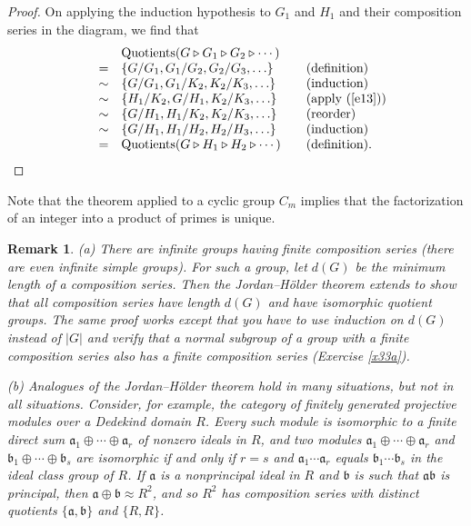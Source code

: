 \documentclass[a4paper,11pt,final,openany]{memoir}%
\newtheorem{remark}[X]{Remark}
\theoremstyle{nonumberplain}
\newtheorem{proof}{Proof.}
\begin{document}
\begin{proof}
On applying the induction hypothesis to $G_{1}$ and $H_{1}$ and their
composition series in the diagram, we find that
\[%
\begin{array}
[c]{rclll}%
&&\text{Quotients}(G\triangleright G_{1}\triangleright G_{2}\triangleright
\cdots) \\
& = & \{G/G_{1},G_{1}/G_{2},G_{2}/G_{3},\ldots\} &  &
\text{(definition)}\\
& \sim & \{G/G_{1},G_{1}/K_{2},K_{2}/K_{3},\ldots\} &  & \text{(induction)}\\
& \sim & \{H_{1}/K_{2},G/H_{1},K_{2}/K_{3},\ldots\} &  & \text{(apply
(\ref{e13}))}\\
& \sim & \{G/H_{1},H_{1}/K_{2},K_{2}/K_{3},\ldots\} &  & \text{(reorder)}\\
& \sim & \{G/H_{1},H_{1}/H_{2},H_{2}/H_{3},\ldots\} &  & \text{(induction)}\\
& = & \text{Quotients}(G\triangleright H_{1}\triangleright H_{2}%
\triangleright\cdots) &  & \text{(definition).}%
\end{array}
\]

\end{proof}

Note that the theorem applied to a cyclic group $C_{m}$ implies that the
factorization of an integer into a product of primes is unique.

\begin{remark}
\label{ns03}(a) There are infinite groups having finite composition series
(there are even infinite simple groups). For such a group, let $d(G)$ be the
minimum length of a composition series. Then the Jordan--H\"{o}lder theorem
extends to show that all composition series have length $d(G)$ and have
isomorphic quotient groups. The same proof works except that you have to use
induction on $d(G)$ instead of $|G|$ and verify that a normal subgroup of a
group with a finite composition series also has a finite composition series
(Exercise \ref{x33a}).

(b) Analogues of the Jordan--H\"{o}lder theorem hold in many situations, but
not in all situations. Consider, for example, the category of finitely
generated projective modules over a Dedekind domain $R$. Every such module is
isomorphic to a finite direct sum $\mathfrak{a}_{1}\oplus\cdots\oplus
\mathfrak{a}_{r}$ of nonzero ideals in $R$, and two modules $\mathfrak{a}%
_{1}\oplus\cdots\oplus\mathfrak{a}_{r}$ and $\mathfrak{b}_{1}\oplus
\cdots\oplus\mathfrak{b}_{s}$ are isomorphic if and only if $r=s$ and
$\mathfrak{a}_{1}\cdots\mathfrak{a}_{r}$ equals $\mathfrak{b}_{1}%
\cdots\mathfrak{b}_{s}$ in the ideal class group of $R$. If $\mathfrak{a}$ is
a nonprincipal ideal in $R$ and $\mathfrak{b}$ is such that $\mathfrak{a}%
\mathfrak{b}$ is principal, then $\mathfrak{a}\oplus\mathfrak{b}\approx R^{2}%
$, and so $R^{2}$ has composition series with distinct quotients
$\{\mathfrak{a},\mathfrak{b}\}$ and $\{R,R\}$.
\end{remark}
\end{document}
